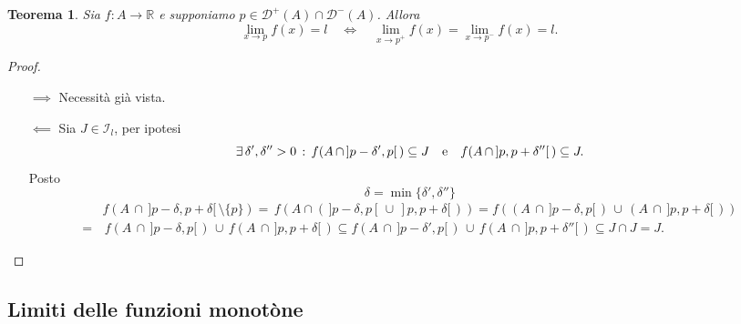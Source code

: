 \documentclass{article}
\theoremstyle{plain}
\newtheorem{thm}{Teorema}[section]
\theoremstyle{definition}
\theoremstyle{remark}
\begin{document}
\begin{bxthm}
\begin{thm}
    Sia $f:A\to\mathbb{R}$ e supponiamo \(p\in\mathcal{D}^+(A)\cap\mathcal{D}^-(A)\).
    Allora \[\lim_{x\to p}f(x)=l\quad\iff\quad\lim_{x\to p^+}f(x)=\lim_{x\to p^-}f(x)=l.\]
\end{thm}
\end{bxthm}
\begin{proof}\hfill
    \begin{itemize}
        \item[$\implies$]
        Necessità già vista.
        \item[$\impliedby$]
        Sia $J\in \mathcal{I}_l$, per ipotesi 
        \[\exists\, \delta',\delta''>0\,:\,f(A\,\cap\, ]p-\delta',p[\,)\subseteq J\quad\textup{e}\quad f(A\,\cap\, ]p,p+\delta''[\,)\subseteq J.\]
        Posto \[\delta=\min\{\delta',\delta''\}\]
        \begin{align*}
            &f(A\,\cap\,]p-\delta,p+\delta[\,\setminus\{p\})=\,f(A\cap(\,]p-\delta,p[\,\cup\,]p,p+\delta[\,))=f((A\,\cap\,]p-\delta,p[\,)\,\cup\,(A\,\cap\,]p,p+\delta[\,))\\
            =&\,f(A\,\cap\,]p-\delta,p[\,)\,\cup\, f(A\,\cap\,]p,p+\delta[\,)\subseteq f(A\,\cap\,]p-\delta',p[\,)\,\cup\, f(A\,\cap\,]p,p+\delta''[\,)\subseteq J\cap J = J.
        \end{align*}
    \end{itemize}
\end{proof}

\vspace{10pt}

\subsection{Limiti delle funzioni monotòne}

\vspace{10pt}
\end{document}
